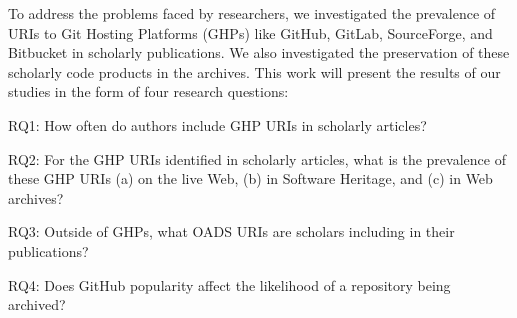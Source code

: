 To address the problems faced by researchers, we investigated the prevalence of URIs to Git Hosting Platforms (GHPs) like GitHub, GitLab, SourceForge, and Bitbucket in scholarly publications. We also investigated the preservation of these scholarly code products in the archives. This work will present the results of our studies in the form of four research questions:

RQ1: How often do authors include GHP URIs in scholarly articles?

RQ2: For the GHP URIs identified in scholarly articles, what is the prevalence of these GHP URIs (a) on the live Web, (b) in Software Heritage, and (c) in Web archives?

RQ3: Outside of GHPs, what OADS URIs are scholars including in their publications?

RQ4: Does GitHub popularity affect the likelihood of a repository being archived? 
